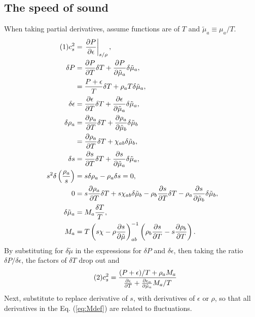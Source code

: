 \documentclass[12pt]{article}
\numberwithin{equation}{section}
\numberwithin{figure}{section}
\newcommand\eqnumber{\addtocounter{equation}{1}\tag{\theequation}}
\begin{document}
\subsection{The speed of sound}
When taking partial derivatives, assume functions are of $T$ and $\tilde{\mu}_a\equiv\mu_a/T$.
\begin{align*}\eqnumber
c_s^2&=\left.\frac{\partial P}{\partial\epsilon}\right|_{s/\rho},\\
\delta P&=\frac{\partial P}{\partial T}\delta T+\frac{\partial P}{\partial\tilde{\mu}_a}\delta\tilde{\mu}_a,\\
&=\frac{P+\epsilon}{T}\delta T+\rho_aT\delta\tilde{\mu}_a,\\
\delta \epsilon&=\frac{\partial\epsilon}{\partial T}\delta T+\frac{\partial\epsilon}{\partial\tilde{\mu}_a}\delta\tilde{\mu}_a,\\
\delta\rho_a&=\frac{\partial \rho_a}{\partial T}\delta T+\frac{\partial \rho_a}{\partial\tilde{\mu}_b}\delta\tilde{\mu}_b\\
&=\frac{\partial \rho_a}{\partial T}\delta T+\chi_{ab}\delta\tilde{\mu}_b,\\
\delta s&=\frac{\partial s}{\partial T}\delta T+\frac{\partial s}{\partial\tilde{\mu}_a}\delta\tilde{\mu}_a,\\
s^2\delta\left(\frac{\rho_a}{s}\right)&=s\delta\rho_a-\rho_a\delta s=0,\\
0&=s\frac{\partial\rho_a}{\partial T}\delta T+s\chi_{ab}\delta\tilde{\mu}_b
-\rho_b\frac{\partial s}{\partial T}\delta T-\rho_a\frac{\partial s}{\partial\tilde{\mu}_b}\delta\tilde{\mu}_b,\\
\delta\tilde{\mu}_a&=M_a\frac{\delta T}{T},\\
\label{eq:Mdef}
M_a&=T\left(s\chi-\rho\frac{\partial s}{\partial\tilde{\mu}}\right)_{ab}^{-1}
\left(\rho_b\frac{\partial s}{\partial T}-s\frac{\partial\rho_b}{\partial T}\right).
\end{align*}
By substituting for $\delta\tilde{\mu}$ in the expressions for $\delta P$ and $\delta\epsilon$, then taking the ratio $\delta P/\delta\epsilon$, the factors of $\delta T$ drop out and
\begin{align*}\eqnumber
c_s^2&=\frac{(P+\epsilon)/T+\rho_aM_a}{\frac{\partial\epsilon}{\partial T}+\frac{\partial\epsilon_a}{\partial\tilde{\mu}_a}M_a/T}
\end{align*}
Next, substitute to replace derivative of $s$, with derivatives of $\epsilon$ or $\rho$, so that all derivatives in the Eq. (\ref{eq:Mdef}) are related to fluctuations.
\end{document}
